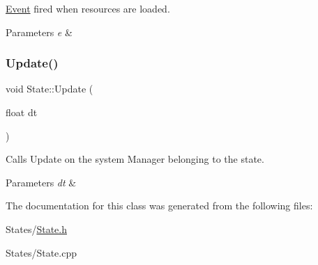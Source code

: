 \hyperlink{classEvent}{Event} fired when resources are loaded. 


\begin{DoxyParams}{Parameters}
{\em e} & \\
\hline
\end{DoxyParams}
\mbox{\label{classState_a1660e74611d9e044a136bea1f96b8f8b}} 
\subsubsection{\texorpdfstring{Update()}{Update()}}
{\footnotesize\ttfamily void State\+::\+Update (\begin{DoxyParamCaption}\item[{float}]{dt }\end{DoxyParamCaption})\hspace{0.3cm}{\ttfamily [virtual]}}



Calls Update on the system Manager belonging to the state. 


\begin{DoxyParams}{Parameters}
{\em dt} & \\
\hline
\end{DoxyParams}


The documentation for this class was generated from the following files\+:\begin{DoxyCompactItemize}
\item 
States/\hyperlink{State_8h}{State.\+h}\item 
States/State.\+cpp\end{DoxyCompactItemize}
